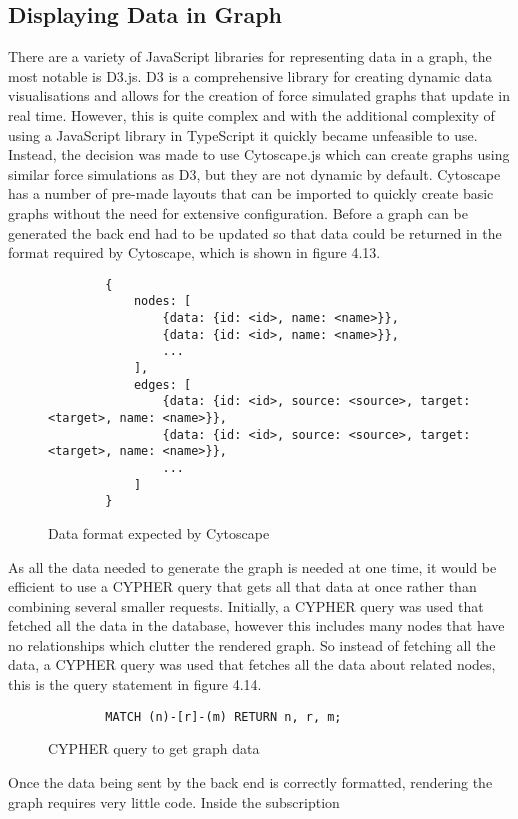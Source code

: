 \subsection{Displaying Data in Graph}
There are a variety of JavaScript libraries for representing data in a graph, the most notable is D3.js. D3 is a comprehensive library 
for creating dynamic data visualisations and allows for the creation of force simulated graphs that update in real time. However, this is 
quite complex and with the additional complexity of using a JavaScript library in TypeScript it quickly became unfeasible to use. 
Instead, the decision was made to use Cytoscape.js which can create graphs using similar force simulations as D3, but they are not 
dynamic by default. Cytoscape has a number of pre-made layouts that can be imported to quickly create basic graphs without the need for 
extensive configuration. Before a graph can be generated the back end had to be updated so that data could be returned in the format required 
by Cytoscape, which is shown in figure 4.13.
\begin{figure}[!htbp]
    \begin{lstlisting}
        {
            nodes: [
                {data: {id: <id>, name: <name>}},
                {data: {id: <id>, name: <name>}},
                ...
            ],
            edges: [
                {data: {id: <id>, source: <source>, target: <target>, name: <name>}},
                {data: {id: <id>, source: <source>, target: <target>, name: <name>}},
                ...
            ]
        }
    \end{lstlisting}
    \caption{Data format expected by Cytoscape}
\end{figure}
As all the data needed to generate the graph is needed at one time, it would be efficient to use a CYPHER query that gets all that 
data at once rather than combining several smaller requests. Initially, a CYPHER query was used that fetched all the data in the database, however 
this includes many nodes that have no relationships which clutter the rendered graph. So instead of fetching all the data, a 
CYPHER query was used that fetches all the data about related nodes, this is the query statement in figure 4.14.
\begin{figure}[!htbp]
    \begin{lstlisting}
        MATCH (n)-[r]-(m) RETURN n, r, m;
    \end{lstlisting}
    \caption{CYPHER query to get graph data}
\end{figure}
Once the data being sent by the back end is correctly formatted, rendering the graph requires very little code. Inside the subscription 
